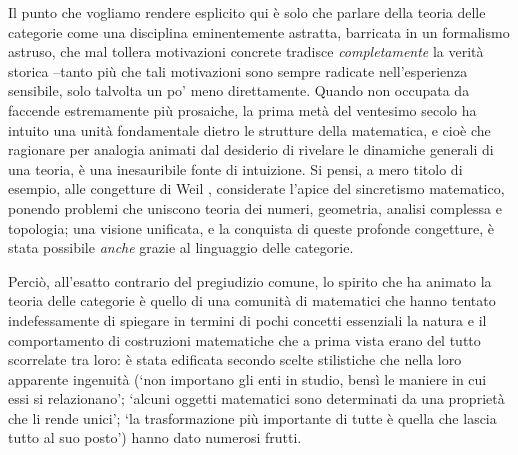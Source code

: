 Il punto che vogliamo rendere esplicito qui è solo che parlare della teoria delle categorie come una disciplina eminentemente astratta, barricata in un formalismo astruso, che mal tollera motivazioni concrete tradisce \emph{completamente} la verità storica --tanto più che tali motivazioni sono sempre radicate nell'esperienza sensibile, solo talvolta un po' meno direttamente. Quando non occupata da faccende estremamente più prosaiche, la prima metà del ventesimo secolo ha intuito una unità fondamentale dietro le strutture della matematica, e cioè che ragionare per analogia animati dal desiderio di rivelare le dinamiche generali di una teoria, è una inesauribile fonte di intuizione. Si pensi, a mero titolo di esempio, alle congetture di Weil \cite{PMIHES_1974__43__273_0,PMIHES_1980__52__137_0}, considerate l'apice del sincretismo matematico, ponendo problemi che uniscono teoria dei numeri, geometria, analisi complessa e topologia; una visione unificata, e la conquista di queste profonde congetture, è stata possibile \emph{anche} grazie al linguaggio delle categorie.

Perciò, all'esatto contrario del pregiudizio comune, lo spirito che ha animato la teoria delle categorie è quello di una comunità di matematici che hanno tentato indefessamente di spiegare in termini di pochi concetti essenziali la natura e il comportamento di costruzioni matematiche che a prima vista erano del tutto scorrelate tra loro: è stata edificata secondo scelte stilistiche che nella loro apparente ingenuità (`non importano gli enti in studio, bensì le maniere in cui essi si relazionano'; `alcuni oggetti matematici sono determinati da una proprietà che li rende unici'; `la trasformazione più importante di tutte è quella che lascia tutto al suo posto') hanno dato numerosi frutti.

